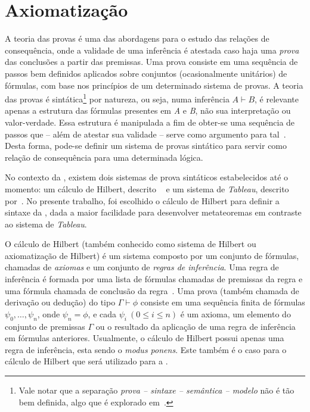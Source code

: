 \section{Axiomatização}\label{sec:axiomatizacao}

    A teoria das provas é uma das abordagens para o estudo das relações de consequência, onde a validade de uma inferência é atestada caso haja uma \textit{prova} das conclusões a partir das premissas. Uma prova consiste em uma sequência de passos bem definidos aplicados sobre conjuntos (ocasionalmente unitários) de fórmulas, com base nos princípios de um determinado sistema de provas. A teoria das provas é sintática\footnote{Vale notar que a separação \textit{prova {--} sintaxe {--} semântica {--} modelo} não é tão bem definida, algo que é explorado em~.} por natureza, ou seja, numa inferência $A \vdash B$, é relevante apenas a estrutura das fórmulas presentes em \textit{A} e \textit{B}, não sua interpretação ou valor-verdade. Essa estrutura é manipulada a fim de obter-se uma sequência de passos que {--} além de atestar sua validade {--} serve como argumento para tal~\cite{sep-logical-consequence}. Desta forma, pode-se definir um sistema de provas sintático para servir como relação de consequência para uma determinada lógica. 

    No contexto da \lfium{}, existem dois sistemas de prova sintáticos estabelecidos até o momento: um cálculo de Hilbert, descrito ~ e um sistema de \textit{Tableau}, descrito por~. No presente trabalho, foi escolhido o cálculo de Hilbert para definir a sintaxe da \lfium{}, dada a maior facilidade para desenvolver metateoremas em contraste ao sistema de \textit{Tableau}.

    O cálculo de Hilbert (também conhecido como sistema de Hilbert ou axiomatização de Hilbert) é um sistema composto por um conjunto de fórmulas, chamadas de \textit{axiomas} e um conjunto de \textit{regras de inferência}. Uma regra de inferência é formada por uma lista de fórmulas chamadas de premissas da regra e uma fórmula chamada de conclusão da regra~\cite{Restall1999-RESAIT-4}. Uma prova (também chamada de derivação ou dedução) do tipo $\Gamma \vdash \phi$ consiste em uma sequência finita de fórmulas \(\psi_0, \dots, \psi_n\), onde \(\psi_n = \phi\), e cada  $\psi_i\ (0 \leq i \leq n)$ é um axioma, um elemento do conjunto de premissas $\Gamma$ ou o resultado da aplicação de uma regra de inferência em fórmulas anteriores. Usualmente, o cálculo de Hilbert possui apenas uma regra de inferência, esta sendo o \textit{modus ponens}. Este também é o caso para o cálculo de Hilbert que será utilizado para a \lfium{}.
    
